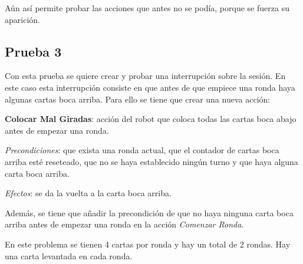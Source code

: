 \documentclass{uc3mpracticas}
\begin{document}
  \vspace{2mm}

  Aún así permite probar las acciones que antes no se podía, porque se fuerza su aparición.


  \subsection{Prueba 3}

  Con esta prueba se quiere crear y probar una interrupción sobre la sesión. En este caso esta interrupción consiste en que antes de que empiece una ronda haya algunas cartas boca arriba. Para ello se tiene que crear una nueva acción:

  \vspace{2mm}

  \textbf{Colocar Mal Giradas}: acción del robot que coloca todas las cartas boca abajo antes de empezar una ronda.

  \vspace{1mm}

    \textit{Precondiciones}: que exista una ronda actual, que el contador de cartas boca arriba esté reseteado, que no se haya establecido ningún turno y que haya alguna carta boca arriba.

    \vspace{1mm}

    \textit{Efectos}: se da la vuelta a la carta boca arriba.


  \vspace{2mm}

  Además, se tiene que añadir la precondición de que no haya ninguna carta boca arriba antes de empezar una ronda en la acción \textit{Comenzar Ronda}.

  \vspace{3mm}

  En este problema se tienen 4 cartas por ronda y hay un total de 2 rondas. Hay una carta levantada en cada ronda.
\end{document}
